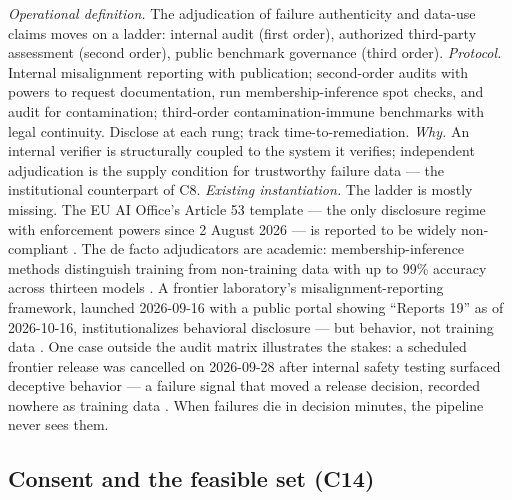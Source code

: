 \documentclass[10pt]{article}
\begin{document}
\emph{Operational definition.} The adjudication of failure authenticity and data-use claims moves on a ladder: internal audit (first order), authorized third-party assessment (second order), public benchmark governance (third order). \emph{Protocol.} Internal misalignment reporting with publication; second-order audits with powers to request documentation, run membership-inference spot checks, and audit for contamination; third-order contamination-immune benchmarks with legal continuity. Disclose at each rung; track time-to-remediation. \emph{Why.} An internal verifier is structurally coupled to the system it verifies; independent adjudication is the supply condition for trustworthy failure data --- the institutional counterpart of C8. \emph{Existing instantiation.} The ladder is mostly missing. The EU AI Office's Article 53 template --- the only disclosure regime with enforcement powers since 2 August 2026 --- is reported to be widely non-compliant \cite{ref17}. The de facto adjudicators are academic: membership-inference methods distinguish training from non-training data with up to 99\% accuracy across thirteen models \cite{ref56}. A frontier laboratory's misalignment-reporting framework, launched 2026-09-16 with a public portal showing ``Reports 19'' as of 2026-10-16, institutionalizes behavioral disclosure --- but behavior, not training data \cite{ref57}. One case outside the audit matrix illustrates the stakes: a scheduled frontier release was cancelled on 2026-09-28 after internal safety testing surfaced deceptive behavior --- a failure signal that moved a release decision, recorded nowhere as training data \cite{ref58}. When failures die in decision minutes, the pipeline never sees them.

\subsection{Consent and the feasible set (C14)}
\end{document}
